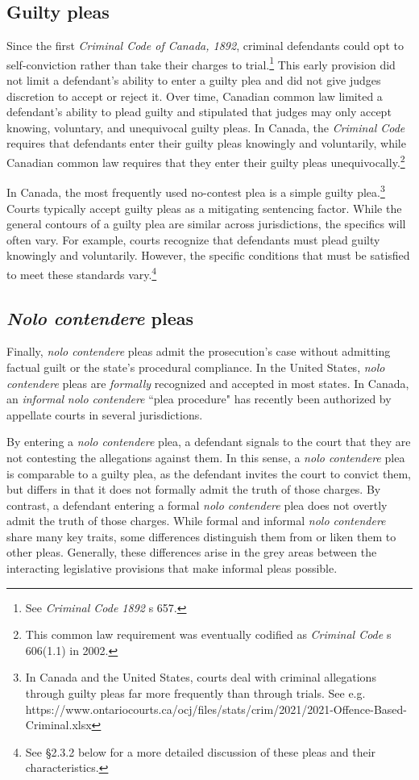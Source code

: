 \subsection{Guilty pleas}

Since the first \textit{Criminal Code of Canada, 1892}, criminal defendants could opt to self-conviction rather than take their charges to trial.\footnote{See \textit{Criminal Code 1892} s 657.} This early provision did not limit a defendant's ability to enter a guilty plea and did not give judges discretion to accept or reject it. Over time, Canadian common law limited a defendant's ability to plead guilty and stipulated that judges may only accept knowing, voluntary, and unequivocal guilty pleas. In Canada, the \textit{Criminal Code} requires that defendants enter their guilty pleas knowingly and voluntarily, while Canadian common law requires that they enter their guilty pleas unequivocally.\footnote{This common law requirement was eventually codified as \textit{Criminal Code} s 606(1.1) in 2002.}

In Canada, the most frequently used no-contest plea is a simple guilty plea.\footnote{In Canada and the United States, courts deal with criminal allegations through guilty pleas far more frequently than through trials. See e.g. https://www.ontariocourts.ca/ocj/files/stats/crim/2021/2021-Offence-Based-Criminal.xlsx} Courts typically accept guilty pleas as a mitigating sentencing factor. While the general contours of a guilty plea are similar across jurisdictions, the specifics will often vary. For example, courts recognize that defendants must plead guilty knowingly and voluntarily. However, the specific conditions that must be satisfied to meet these standards vary.\footnote{See §2.3.2 below for a more detailed discussion of these pleas and their characteristics.} 

\subsection{\textit{Nolo contendere} pleas}

Finally, \textit{nolo contendere} pleas admit the prosecution's case without admitting factual guilt or the state's procedural compliance. In the United States, \textit{nolo contendere} pleas are \textit{formally} recognized and accepted in most states. In Canada, an \textit{informal} \textit{nolo contendere} ``plea procedure" has recently been authorized by appellate courts in several jurisdictions. 

By entering a \textit{nolo contendere} plea, a defendant signals to the court that they are not contesting the allegations against them. In this sense, a \textit{nolo contendere} plea is comparable to a guilty plea, as the defendant invites the court to convict them, but differs in that it does not formally admit the truth of those charges. By contrast, a defendant entering a formal \textit{nolo contendere} plea does not overtly admit the truth of those charges. While formal and informal \textit{nolo contendere} share many key traits, some differences distinguish them from or liken them to other pleas. Generally, these differences arise in the grey areas between the interacting legislative provisions that make informal pleas possible.